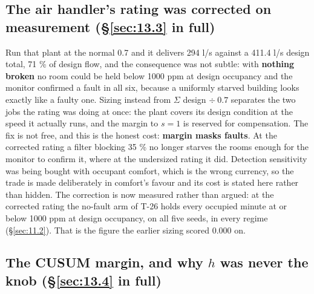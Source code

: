 \subsection{The air handler's rating was corrected on measurement (\texorpdfstring{\S\ref{sec:13.3}}{13.3} in full)}\label{sec:I.2}

Run that plant at the normal 0.7 and it delivers 294 l/s against a 411.4 l/s design total, 71 \% of
design flow, and the consequence was not subtle: with \textbf{nothing broken} no room could be held
below 1000 ppm at design occupancy and the monitor confirmed a fault in all six, because a uniformly
starved building looks exactly like a faulty one. Sizing instead from $\Sigma$ design $\div\ 0.7$
separates the two jobs the rating was doing at once: the plant covers its design condition at the
speed it actually runs, and the margin to $s=1$ is reserved for compensation. The fix is not free,
and this is the honest cost: \textbf{margin masks faults}. At the corrected rating a filter blocking
35 \% no longer starves the rooms enough for the monitor to confirm it, where at the undersized
rating it did. Detection sensitivity was being bought with occupant comfort, which is the wrong
currency, so the trade is made deliberately in comfort's favour and its cost is stated here rather
than hidden. The correction is now measured rather than argued: at the corrected rating the
no-fault arm of T-26 holds every occupied minute at or below 1000 ppm at design occupancy, on all
five seeds, in every regime (§\ref{sec:11.2}). That is the figure the earlier sizing scored 0.000 on.


\subsection{The CUSUM margin, and why $h$ was never the knob (\texorpdfstring{\S\ref{sec:13.4}}{13.4} in full)}\label{sec:I.3}


